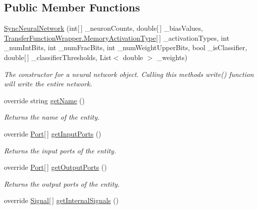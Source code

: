 \subsection*{Public Member Functions}
\begin{DoxyCompactItemize}
\item 
\hyperlink{class_n_n_gen_1_1_sync_neural_network_a668e06ab5c0814666d34e5d5fddce9dc}{Sync\+Neural\+Network} (int\mbox{[}$\,$\mbox{]} \+\_\+neuron\+Counts, double\mbox{[}$\,$\mbox{]} \+\_\+bias\+Values, \hyperlink{class_n_n_gen_1_1_transfer_function_wrapper_aa338ffadb8fcdf76df75419374a51ff6}{Transfer\+Function\+Wrapper.\+Memory\+Activation\+Type}\mbox{[}$\,$\mbox{]} \+\_\+activation\+Types, int \+\_\+num\+Int\+Bits, int \+\_\+num\+Frac\+Bits, int \+\_\+num\+Weight\+Upper\+Bits, bool \+\_\+is\+Classifier, double\mbox{[}$\,$\mbox{]} \+\_\+classifier\+Thresholds, List$<$ double $>$ \+\_\+weights)
\begin{DoxyCompactList}\small\item\em The constructor for a neural network object. Calling this method\textquotesingle{}s write() function will write the entire network. \end{DoxyCompactList}\item 
override string \hyperlink{class_n_n_gen_1_1_sync_neural_network_a91d58e0d612c6398c3164dee0fc34347}{get\+Name} ()
\begin{DoxyCompactList}\small\item\em Returns the name of the entity. \end{DoxyCompactList}\item 
override \hyperlink{class_n_n_gen_1_1_port}{Port}\mbox{[}$\,$\mbox{]} \hyperlink{class_n_n_gen_1_1_sync_neural_network_a8ed253e22e640d3ec0501dd1c43ad784}{get\+Input\+Ports} ()
\begin{DoxyCompactList}\small\item\em Returns the input ports of the entity. \end{DoxyCompactList}\item 
override \hyperlink{class_n_n_gen_1_1_port}{Port}\mbox{[}$\,$\mbox{]} \hyperlink{class_n_n_gen_1_1_sync_neural_network_aff93a78db054336cfe8b2f43885f145d}{get\+Output\+Ports} ()
\begin{DoxyCompactList}\small\item\em Returns the output ports of the entity. \end{DoxyCompactList}\item 
override \hyperlink{class_n_n_gen_1_1_signal}{Signal}\mbox{[}$\,$\mbox{]} \hyperlink{class_n_n_gen_1_1_sync_neural_network_a9303b53dc2d792c18ffa72e386eb0eae}{get\+Internal\+Signals} ()

\end{DoxyCompactItemize}
